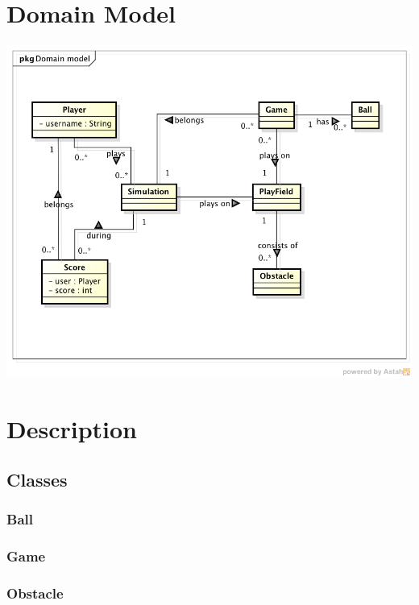 \documentclass[fontsize=12pt,
               paper=a4,
               twoside=false,
               parskip=half,
               ]{scrartcl}
\begin{document}
\newcommand{\doctitle}{Domain Model}


\tableofcontents

\section{Domain Model}

\includegraphics[width=14cm]{./img/domain-model.png}

\section{Description}

\subsection{Classes}

\subsubsection{Ball}

\subsubsection{Game}

\subsubsection{Obstacle}
\end{document}

